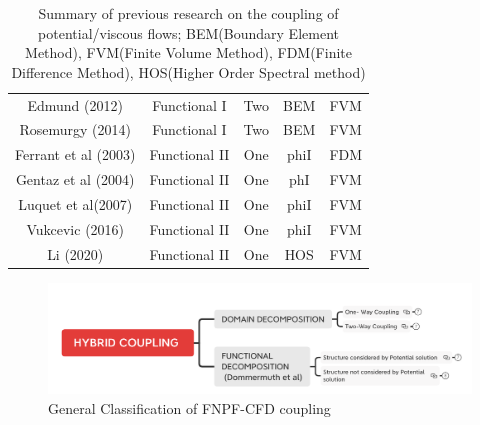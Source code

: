 \documentclass[preprint,12pt]{article}
\begin{document}
{\begin{table}[]
\begin{tabular}{ccccc}
Edmund (2012) \cite{Edmund2013}                                                                         & Functional I           & Two                                                              & BEM                   & FVM                  \\
Rosemurgy (2014)\cite{Rosemurgy2016}                                                                      & Functional I           & Two                                                              & BEM                   & FVM                  \\ \hline
Ferrant et al (2003) \cite{Ferrant2002}                                                                 & Functional II          & One                                                              & phiI                  & FDM                  \\
Gentaz et al (2004) \cite{Gentaz2004}                                                                   & Functional II          & One                                                              & phI                   & FVM                  \\
Luquet et al(2007) \cite{Luquet2007}                                                                   & Functional II          & One                                                              & phiI                  & FVM                  \\
Vukcevic (2016)\cite{Vukcevic2016}                                                                       & Functional II          & One                                                              & phiI                  & FVM                  \\
Li (2020) \cite{zhaobin_progress}                                                                             & Functional II          & One                                                              & HOS                   & FVM                  \\ \hline
\end{tabular}
\caption{Summary of previous research on the coupling of potential/viscous flows; BEM(Boundary Element Method), FVM(Finite Volume Method), FDM(Finite Difference Method), HOS(Higher Order Spectral method)}
\label{DDandFD}
\end{table}


\begin{figure}[]
 \centering 
 \includegraphics[width=\textwidth]{HYBRID_COUPLING1.png}
 \caption{General Classification of FNPF-CFD coupling}
\end{figure}


}
\end{document}
